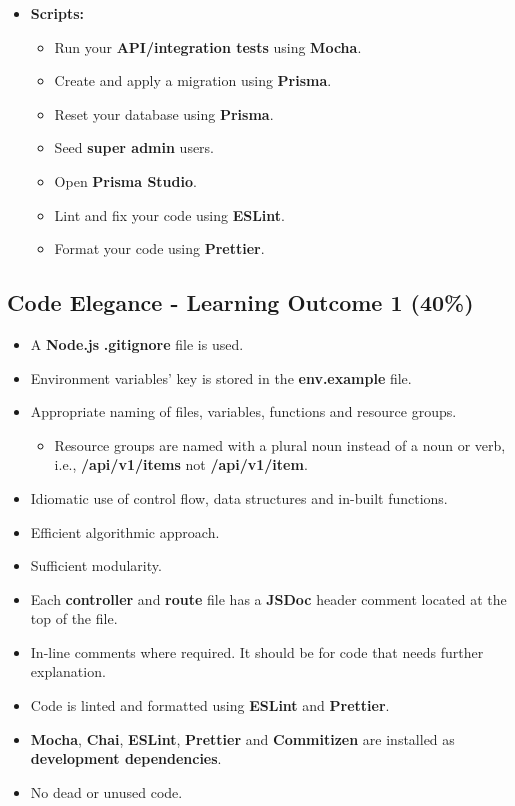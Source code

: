 \documentclass{article}
\begin{document}
\begin{itemize}
	\item \textbf{Scripts:}
	\begin{itemize}
		\item Run your \textbf{API/integration tests} using \textbf{Mocha}.
		\item Create and apply a migration using \textbf{Prisma}.
		\item Reset your database using \textbf{Prisma}.
		\item Seed \textbf{super admin} users.
		\item Open \textbf{Prisma Studio}. 
		\item Lint and fix your code using \textbf{ESLint}.
		\item Format your code using \textbf{Prettier}.
	\end{itemize}
\end{itemize} 

\subsection*{Code Elegance - Learning Outcome 1 (40\%)}
\begin{itemize}
	\item A \textbf{Node.js} \textbf{.gitignore} file is used.
	\item Environment variables' key is stored in the \textbf{env.example} file. 
	\item Appropriate naming of files, variables, functions and resource groups.
	\begin{itemize}
	  \item Resource groups are named with a plural noun instead of a noun or verb, i.e., \textbf{/api/v1/items} not \textbf{/api/v1/item}.
	\end{itemize}
	\item Idiomatic use of control flow, data structures and in-built functions.
	  \item Efficient algorithmic approach.
  \item Sufficient modularity.
  \item Each \textbf{controller} and \textbf{route} file has a \textbf{JSDoc} header comment located at the top of the file.
\item In-line comments where required. It should be for code that needs further explanation.
	\item Code is linted and formatted using \textbf{ESLint} and \textbf{Prettier}.
	\item \textbf{Mocha}, \textbf{Chai}, \textbf{ESLint}, \textbf{Prettier} and \textbf{Commitizen} are installed as \textbf{development dependencies}.	
	\item No dead or unused code.
\end{itemize}
\end{document}
